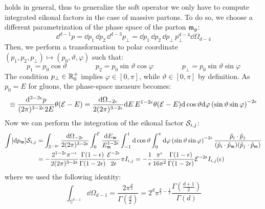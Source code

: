  holds in general, thus to generalize the soft operator we only have to compute integrated eikonal factors in the case of massive partons. To do so, we choose a different parametrization of the phase space of the parton $ \mathfrak{m}_g $:
\begin{equation}
  \dd^{d-1} p = \dd p_1 \, \dd p_2 \, \dd^{d-3} p_\perp = \dd p_1 \, \dd p_2 \, \dd p_\perp \, p_\perp^{d-4} \dd \Omega_{d-4}
\end{equation}
Then, we perform a transformation to polar coordinate $ (p_1 , p_2 , p_\perp) \mapsto (p_0 , \vartheta , \varphi) $ such that:
\begin{equation}
  p_1 = p_0 \cos \vartheta
  \qquad \qquad
  p_2 = p_0 \sin \vartheta \cos \varphi
  \qquad \qquad
  p_\perp = p_0 \sin \vartheta \sin \varphi
\end{equation}
The condition $ p_\perp \in \mathbb{R}^+_0 $ implies $ \varphi \in [0,\pi] $, while $ \vartheta \in [0,\pi] $ by definition. As $ p_0 = E $ for gluons, the phase-space measure becomes:
\begin{equation}
  [\dd p] \equiv \frac{\dd^{3-2\de}p}{(2\pi)^{3-2\de}2E} \theta(\ema - E) = \frac{\dd \Omega_{-2\de}}{2(2\pi)^{3-2\de}} \dd E\, E^{1-2\de} \theta(\ema - E) \dd \cos \vartheta \dd \varphi \left( \sin \vartheta \sin \varphi \right)^{-2\de}
\end{equation}
Now we can perform the integration of the eikonal factor $ \mathcal{S}_{i,j} $:
\begin{equation*}
  \begin{split}
    \int [\mathrm{d} p_{\mathfrak{m}}] \mathcal{S}_{i,j}
    & = \int_{\mathbb{S}^{-2\epsilon}} \frac{\mathrm{d} \Omega_{-2\epsilon}}{2(2\pi)^{3-2\epsilon}} \int_0^{\mathcal{E}} \frac{\mathrm{d} E_{\mathfrak{m}}}{E_{\mathfrak{m}}^{1-2\epsilon}} \int_{-1}^1 \mathrm{d} \cos \vartheta \int_0^\pi \mathrm{d} \varphi \left( \sin \vartheta \sin \varphi \right)^{-2\epsilon} \frac{\hat{p}_i \cdot \hat{p}_j}{(\hat{p}_i \cdot \hat{p}_{\mathfrak{m}}) (\hat{p}_j \cdot \hat{p}_{\mathfrak{m}})} \\
    & = - \frac{2^{1-2\epsilon} \pi^{-\epsilon}}{2(2\pi)^{3-2\epsilon}} \frac{\Gamma(1-\epsilon)}{\Gamma(1-2\epsilon)} \frac{\mathcal{E}^{-2\epsilon}}{2\epsilon} \pi I_{i,j} = - \frac{1}{\epsilon} \frac{\pi^\epsilon}{16\pi^2} \frac{\Gamma(1-\epsilon)}{\Gamma(1-2\epsilon)} \mathcal{E}^{-2\epsilon} I_{i,j}(\epsilon)
  \end{split}
\end{equation*}
where we used the following identity:
\begin{equation}
  \int_{\mathbb{S}^{d-1}} \dd \Omega_{d-1} = \frac{2 \pi^{\frac{d}{2}}}{\Gamma(\frac{d}{2})} = 2^d \pi^{\frac{d}{2} - \frac{1}{2}} \frac{\Gamma\left( \frac{d+1}{2} \right)}{\Gamma(d)}
\end{equation}
